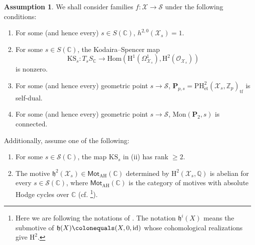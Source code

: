 \documentclass[11pt, letterpaper]{amsart}
\theoremstyle{plain}
\theoremstyle{definition}
\newtheorem{assumption}[theorem]{Assumption}
\newcommand{\IC}{\mathbb{C}}
\newcommand{\IQ}{\mathbb{Q}}
\newcommand{\IZ}{\mathbb{Z}}
\newcommand{\Hom}{\mathrm{Hom}}
\newcommand{\<}{\langle}
\renewcommand{\>}{\rangle}
\newcommand{\Ohm}{\Omega}
\newcommand{\sO}{\mathcal{O}}
\newcommand{\et}{\mathrm{{\acute{e}}t}}
\newcommand{\sX}{\mathcal{X}}
\renewcommand{\H}{\mathrm{H}}
\newcommand{\PH}{\mathrm{PH}}
\newcommand{\sS}{\mathcal{S}}
\newcommand{\bP}{\mathbf{P}}
\newcommand{\fh}{\mathfrak{h}}
\begin{document}
\begin{assumption}\label{assump: period} We shall consider families $f : \sX \to \sS$ under the following conditions:

\begin{enumerate}[label=\upshape{(\roman*)}]
    \item For some (and hence every) $s \in S(\IC)$, $h^{2,0}(\sX_s) = 1$. 
    \item For some $s \in S(\IC)$, the Kodaira--Spencer map 
    $$ \mathrm{KS}_s : T_s S_\IC \to \Hom(\H^1(\Ohm^1_{\sX_s}), \H^2(\sO_{\sX_s})) $$
    is nonzero. 
    \item For some (and hence every) geometric point $s \to \sS$, $\bP_{p, s} = \PH^2_\et(\sX_s, \IZ_p)_{\mathrm{tf}}$ is self-dual. 
    \item For some (and hence every) geometric point $s \to \sS$, $\mathrm{Mon}(\bP_2, s)$ is connected. 
\end{enumerate}
Additionally, assume one of the following: 
\begin{enumerate}
    \item[(v)] For some $s \in \sS(\IC)$, the map $\mathrm{KS}_s$ in (ii) has rank $\ge 2$. 
    \item[(vi)] The motive $\fh^2(\sX_s) \in \mathsf{Mot}_{\mathrm{AH}}(\IC)$ determined by $\H^2(\sX_s, \IQ)$ is abelian for every $s \in \sS(\IC)$, where $\mathsf{Mot}_{\mathrm{AH}}(\IC)$ is the category of motives with absolute Hodge cycles over $\IC$ (cf. \cite[\S2]{Pan94}\footnote{Here we are following the notations of \cite[\S2]{MPTate}. The notation $\fh^i(X)$ means the submotive of $\fh(X) \colonequals (X, 0, \mathrm{id})$ whose cohomological realizations give $\H^2$.}). 
\end{enumerate}
\end{assumption}
\end{document}
